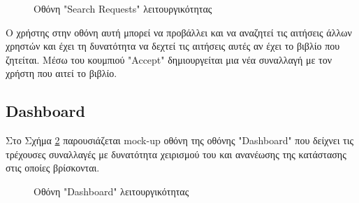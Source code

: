 \documentclass[12pt,a4paper]{article}
\begin{document}
\begin{figure}[H]
	\caption{Οθόνη "Search Requests" λειτουργικότητας}
	\label{Οθόνη "Search Requests" λειτουργικότητας}
\end{figure}

Ο χρήστης στην οθόνη αυτή μπορεί να προβάλλει και να αναζητεί τις αιτήσεις άλλων χρηστών και έχει τη δυνατότητα να δεχτεί τις αιτήσεις αυτές αν έχει το βιβλίο που ζητείται. Μέσω του κουμπιού "Accept" δημιουργείται μια νέα συναλλαγή με τον χρήστη που αιτεί το βιβλίο.

\subsection{Dashboard}

Στο Σχήμα \ref{Οθόνη "Dashboard" λειτουργικότητας} παρουσιάζεται mock-up οθόνη της οθόνης "Dashboard" που δείχνει τις τρέχουσες συναλλαγές με δυνατότητα χειρισμού του και ανανέωσης της κατάστασης στις οποίες βρίσκονται.

\begin{figure}[H]
	\caption{Οθόνη "Dashboard" λειτουργικότητας}
	\label{Οθόνη "Dashboard" λειτουργικότητας}
\end{figure}
\end{document}
